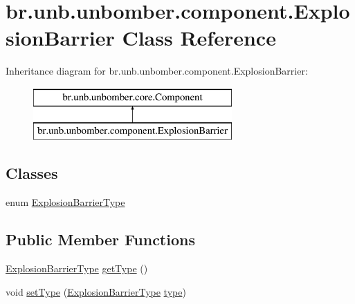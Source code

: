 \hypertarget{classbr_1_1unb_1_1unbomber_1_1component_1_1_explosion_barrier}{\section{br.\+unb.\+unbomber.\+component.\+Explosion\+Barrier Class Reference}
\label{classbr_1_1unb_1_1unbomber_1_1component_1_1_explosion_barrier}
}
Inheritance diagram for br.\+unb.\+unbomber.\+component.\+Explosion\+Barrier\+:\begin{figure}[H]
\begin{center}
\leavevmode
\includegraphics[height=2.000000cm]{classbr_1_1unb_1_1unbomber_1_1component_1_1_explosion_barrier}
\end{center}
\end{figure}
\subsection*{Classes}
\begin{DoxyCompactItemize}
\item 
enum \hyperlink{enumbr_1_1unb_1_1unbomber_1_1component_1_1_explosion_barrier_1_1_explosion_barrier_type}{Explosion\+Barrier\+Type}
\end{DoxyCompactItemize}
\subsection*{Public Member Functions}
\begin{DoxyCompactItemize}
\item 
\hyperlink{enumbr_1_1unb_1_1unbomber_1_1component_1_1_explosion_barrier_1_1_explosion_barrier_type}{Explosion\+Barrier\+Type} \hyperlink{classbr_1_1unb_1_1unbomber_1_1component_1_1_explosion_barrier_a384e1fec08afda813fbc2d06ac40a686}{get\+Type} ()
\item 
void \hyperlink{classbr_1_1unb_1_1unbomber_1_1component_1_1_explosion_barrier_a751199b2b7e500c3b13819e625e4f979}{set\+Type} (\hyperlink{enumbr_1_1unb_1_1unbomber_1_1component_1_1_explosion_barrier_1_1_explosion_barrier_type}{Explosion\+Barrier\+Type} \hyperlink{classbr_1_1unb_1_1unbomber_1_1component_1_1_explosion_barrier_a6678091bcf2ec0118ad896d6502da892}{type})
\end{DoxyCompactItemize}
